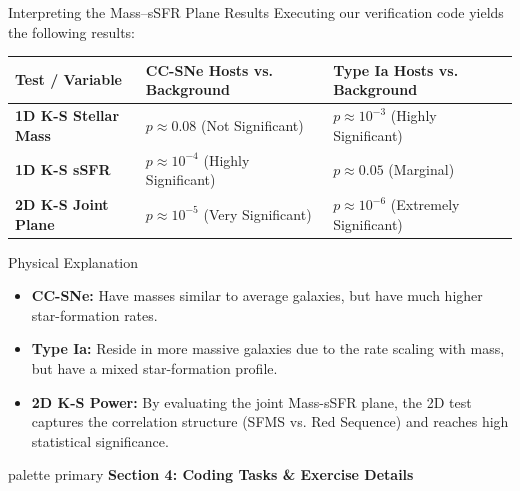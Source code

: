\documentclass[9pt]{beamer}
\begin{document}
\begin{frame}{Interpreting the Mass--sSFR Plane Results}
  Executing our verification code yields the following results:
  \begin{table}
    \centering
    \begin{tabular}{lll}
      \toprule
      Test / Variable & CC-SNe Hosts vs. Background & Type Ia Hosts vs. Background \\
      \midrule
      \textbf{1D K-S Stellar Mass} & $p \approx 0.08$ (Not Significant) & $p \approx 10^{-3}$ (Highly Significant) \\
      \textbf{1D K-S sSFR}         & $p \approx 10^{-4}$ (Highly Significant) & $p \approx 0.05$ (Marginal) \\
      \textbf{2D K-S Joint Plane}  & \alert{$p \approx 10^{-5}$} (Very Significant) & \alert{$p \approx 10^{-6}$} (Extremely Significant) \\
      \bottomrule
    \end{tabular}
  \end{table}
  \begin{block}{Physical Explanation}
    \begin{itemize}
      \item \textbf{CC-SNe:} Have masses similar to average galaxies, but have much higher star-formation rates.
      \item \textbf{Type Ia:} Reside in more massive galaxies due to the rate scaling with mass, but have a mixed star-formation profile.
      \item \textbf{2D K-S Power:} By evaluating the joint Mass-sSFR plane, the 2D test captures the correlation structure (SFMS vs. Red Sequence) and reaches high statistical significance.
    \end{itemize}
  \end{block}
\end{frame}

\begin{frame}[plain]
  \vfill
  \centering
  \begin{beamercolorbox}[sep=8pt,center,shadow=true,rounded=true]{palette primary}
    \textbf{Section 4: Coding Tasks \& Exercise Details}
  \end{beamercolorbox}
  \vfill
\end{frame}
\end{document}
